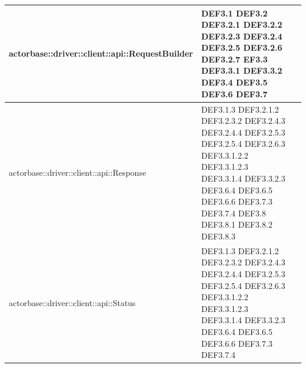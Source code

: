 \documentclass{scalatekids-article}
\begin{document}
\begin{longtable}[H]{|p{12cm}|p{5.5cm}|}
  \hline
  actorbase::driver::client::api::RequestBuilder & \multiLineCell[t]{DEF3.1 DEF3.2\\DEF3.2.1 DEF3.2.2\\DEF3.2.3 DEF3.2.4\\DEF3.2.5 DEF3.2.6\\DEF3.2.7 EF3.3\\DEF3.3.1 DEF3.3.2\\DEF3.4 DEF3.5\\DEF3.6 DEF3.7\\}\\
  \hline
  actorbase::driver::client::api::Response & \multiLineCell[t]{DEF3.1.3 DEF3.2.1.2\\DEF3.2.3.2 DEF3.2.4.3\\DEF3.2.4.4 DEF3.2.5.3\\DEF3.2.5.4 DEF3.2.6.3\\DEF3.3.1.2.2 DEF3.3.1.2.3\\DEF3.3.1.4 DEF3.3.2.3\\DEF3.6.4 DEF3.6.5\\DEF3.6.6 DEF3.7.3\\DEF3.7.4 DEF3.8\\DEF3.8.1 DEF3.8.2\\DEF3.8.3}\\
  \hline
  actorbase::driver::client::api::Status & \multiLineCell[t]{DEF3.1.3 DEF3.2.1.2\\DEF3.2.3.2 DEF3.2.4.3\\DEF3.2.4.4 DEF3.2.5.3\\DEF3.2.5.4 DEF3.2.6.3\\DEF3.3.1.2.2 DEF3.3.1.2.3\\DEF3.3.1.4 DEF3.3.2.3\\DEF3.6.4 DEF3.6.5\\DEF3.6.6 DEF3.7.3\\DEF3.7.4}\\
  \hline

\end{longtable}
\end{document}
